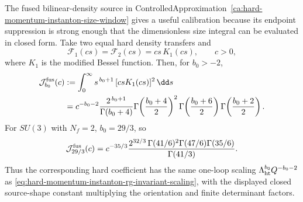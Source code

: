 \begin{proposition}
\label{prop:instanton-fused-source-hard-size-integral}
The fused bilinear-density source in
ControlledApproximation~\ref{ca:hard-momentum-instanton-size-window} gives a
useful calibration because its endpoint suppression is strong enough that the
dimensionless size integral can be evaluated in closed form.  Take two equal
hard density transfers and
\[
  \mathcal F_1(cs)=\mathcal F_2(cs)=cs\,K_1(cs),
  \qquad c>0,
\]
where \(K_1\) is the modified Bessel function.  Then, for \(b_0>-2\),
\begin{equation}
\begin{aligned}
  \mathcal J_{b_0}^{\rm fus}(c)
  &:=
  \int_0^\infty
    s^{\,b_0+1}\,[csK_1(cs)]^2\,\dd s  \\
  &=
  c^{-b_0-2}
  \frac{2^{\,b_0+1}}{\Gamma(b_0+4)}
  \Gamma\!\left(\frac{b_0+4}{2}\right)^2
  \Gamma\!\left(\frac{b_0+6}{2}\right)
  \Gamma\!\left(\frac{b_0+2}{2}\right).
\end{aligned}
  \label{eq:instanton-fused-source-hard-mellin-integral}
\end{equation}
For \(SU(3)\) with \(N_f=2\), \(b_0=29/3\), so
\begin{equation}
  \mathcal J_{29/3}^{\rm fus}(c)
  =
  c^{-35/3}
  \frac{2^{32/3}\,
  \Gamma(41/6)^2\Gamma(47/6)\Gamma(35/6)}
       {\Gamma(41/3)} .
  \label{eq:su3-nf2-fused-source-hard-mellin-integral}
\end{equation}
Thus the corresponding hard coefficient has the same one-loop scaling
\(\Lambda_{\rm ht}^{b_0}Q^{-b_0-2}\) as
\eqref{eq:hard-momentum-instanton-rg-invariant-scaling}, with the displayed
closed source-shape constant multiplying the orientation and finite
determinant factors.
\end{proposition}


